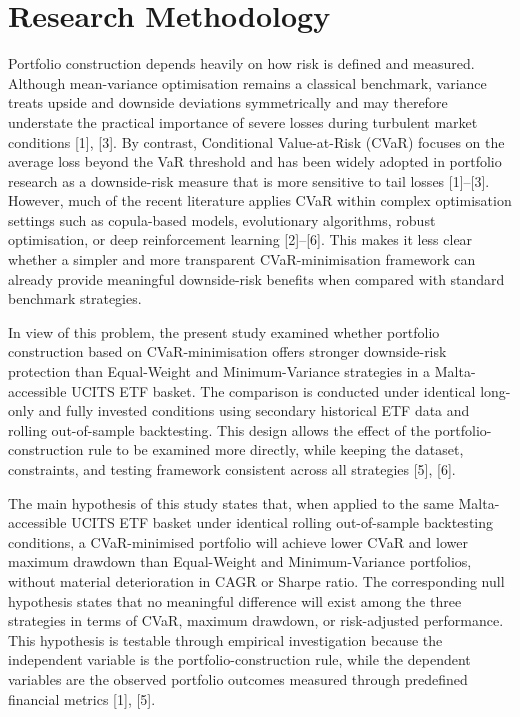 \section{Research Methodology}
\label{sec:Res}
\par  Portfolio construction depends heavily on how risk is defined and measured. Although mean-variance optimisation remains a classical benchmark, variance treats upside and downside deviations symmetrically and may therefore understate the practical importance of severe losses during turbulent market conditions [1], [3]. By contrast, Conditional Value-at-Risk (CVaR) focuses on the average loss beyond the VaR threshold and has been widely adopted in portfolio research as a downside-risk measure that is more sensitive to tail losses [1]–[3]. However, much of the recent literature applies CVaR within complex optimisation settings such as copula-based models, evolutionary algorithms, robust optimisation, or deep reinforcement learning [2]–[6]. This makes it less clear whether a simpler and more transparent CVaR-minimisation framework can already provide meaningful downside-risk benefits when compared with standard benchmark strategies.

\par In view of this problem, the present study examined whether portfolio construction based on CVaR-minimisation offers stronger downside-risk protection than Equal-Weight and Minimum-Variance strategies in a Malta-accessible UCITS ETF basket. The comparison is conducted under identical long-only and fully invested conditions using secondary historical ETF data and rolling out-of-sample backtesting. This design allows the effect of the portfolio-construction rule to be examined more directly, while keeping the dataset, constraints, and testing framework consistent across all strategies [5], [6].

\par The main hypothesis of this study states that, when applied to the same Malta-accessible UCITS ETF basket under identical rolling out-of-sample backtesting conditions, a CVaR-minimised portfolio will achieve lower CVaR and lower maximum drawdown than Equal-Weight and Minimum-Variance portfolios, without material deterioration in CAGR or Sharpe ratio. The corresponding null hypothesis states that no meaningful difference will exist among the three strategies in terms of CVaR, maximum drawdown, or risk-adjusted performance. This hypothesis is testable through empirical investigation because the independent variable is the portfolio-construction rule, while the dependent variables are the observed portfolio outcomes measured through predefined financial metrics [1], [5].

